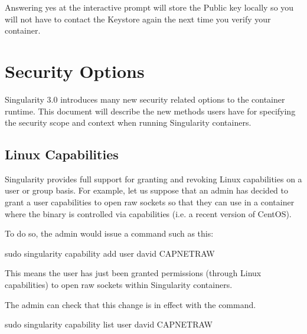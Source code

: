 \documentclass[letterpaper,10pt,english]{sphinxmanual}
\begin{document}
Answering yes at the interactive prompt will store the Public key locally so
you will not have to contact the Keystore again the next time you verify your
container.


\chapter{Security Options}
\label{\detokenize{security_options:security-options}}\label{\detokenize{security_options:id1}}\label{\detokenize{security_options::doc}}\label{\detokenize{security_options:sec-security-options}}
Singularity 3.0 introduces many new security related options to the container
runtime.  This document will describe the new methods users have for specifying
the security scope and context when running Singularity containers.


\section{Linux Capabilities}
\label{\detokenize{security_options:linux-capabilities}}
Singularity provides full support for granting and revoking Linux capabilities
on a user or group basis.  For example, let us suppose that an admin has
decided to grant a user capabilities to open raw sockets so that they can use
 in a container where the binary is controlled via capabilities (i.e. a
recent version of CentOS).

To do so, the admin would issue a command such as this:

%
\begin{sphinxVerbatim}[commandchars=\\\{\}]
\PYGZdl{} sudo singularity capability add \PYGZhy{}\PYGZhy{}user david CAP\PYGZus{}NET\PYGZus{}RAW
\end{sphinxVerbatim}

This means the user  has just been granted permissions (through Linux
capabilities) to open raw sockets within Singularity containers.

The admin can check that this change is in effect with the 
command.

%
\begin{sphinxVerbatim}[commandchars=\\\{\}]
\PYGZdl{} sudo singularity capability list \PYGZhy{}\PYGZhy{}user david
CAP\PYGZus{}NET\PYGZus{}RAW
\end{sphinxVerbatim}
\end{document}
